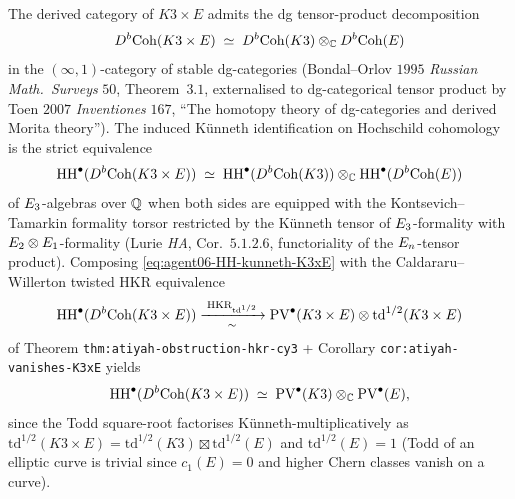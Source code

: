 \begin{lemma}
\label{lem:agent06-categorical-kunneth}
\ClaimStatusVerified
The derived category of $K3 \times E$ admits the dg tensor-product
decomposition
\begin{equation}
\label{eq:agent06-bondal-orlov-K3xE}
 D^b\mathrm{Coh}(K3 \times E) \;\simeq\;
 D^b\mathrm{Coh}(K3) \otimes_\mathbb C D^b\mathrm{Coh}(E)
\end{equation}
in the $(\infty,1)$-category of stable dg-categories
(Bondal--Orlov $1995$ \emph{Russian Math.\ Surveys} $50$, Theorem~$3.1$,
externalised to dg-categorical tensor product by Toen $2007$
\emph{Inventiones} $167$, ``The homotopy theory of dg-categories and
derived Morita theory''). The induced K\"unneth identification on
Hochschild cohomology is the strict equivalence
\begin{equation}
\label{eq:agent06-HH-kunneth-K3xE}
 \mathrm{HH}^\bullet(D^b\mathrm{Coh}(K3 \times E)) \;\simeq\;
 \mathrm{HH}^\bullet(D^b\mathrm{Coh}(K3)) \otimes_\mathbb C \mathrm{HH}^\bullet(D^b\mathrm{Coh}(E))
\end{equation}
of $E_3$-algebras over $\mathbb Q$ when both sides are equipped with the
Kontsevich--Tamarkin formality torsor restricted by the K\"unneth tensor
of $E_3$-formality with $E_2 \otimes E_1$-formality
\textup{(}Lurie \textit{HA}, Cor.~$5.1.2.6$, functoriality of the
$E_n$-tensor product\textup{).} Composing
\eqref{eq:agent06-HH-kunneth-K3xE} with the Caldararu--Willerton
twisted HKR equivalence
\begin{equation}
\label{eq:agent06-HKR-K3xE}
 \mathrm{HH}^\bullet(D^b\mathrm{Coh}(K3 \times E))
 \xrightarrow[\sim]{\;\mathrm{HKR}_{\mathrm{td}^{1/2}}\;}
 \mathrm{PV}^\bullet(K3 \times E) \otimes \mathrm{td}^{1/2}(K3 \times E)
\end{equation}
of Theorem \texttt{thm:atiyah-obstruction-hkr-cy3} +
Corollary \texttt{cor:atiyah-vanishes-K3xE} yields
\begin{equation}
\label{eq:agent06-HH-PV-K3xE}
 \mathrm{HH}^\bullet(D^b\mathrm{Coh}(K3 \times E)) \;\simeq\;
 \mathrm{PV}^\bullet(K3) \otimes_\mathbb C \mathrm{PV}^\bullet(E),
\end{equation}
since the Todd square-root factorises K\"unneth-multiplicatively as
$\mathrm{td}^{1/2}(K3 \times E) = \mathrm{td}^{1/2}(K3) \boxtimes
\mathrm{td}^{1/2}(E)$ and $\mathrm{td}^{1/2}(E) = 1$ (Todd of an
elliptic curve is trivial since $c_1(E) = 0$ and higher Chern classes
vanish on a curve).
\end{lemma}

